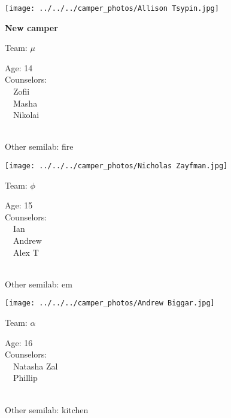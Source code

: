 \documentclass[10pt,letterpaper, landscape]{article}
\begin{document}
\horizontalshiftfornextsticker
\renewcommand{\baselinestretch}{1} \begin{sticker}
\noindent\begin{minipage}{0.5\textwidth}\texttt{[image: ../../../camper\_photos/Allison Tsypin.jpg]}\end{minipage}\begin{minipage}{0.45\textwidth}
\textbf{New camper} 

Team: {\Large $\mu$}

Age:        14\\
Counselors: \\\ \ Zofii\\\ \ Masha\\\ \ Nikolai\\
\end{minipage} \\ \vspace{0.07in}
Other semilab: fire
\end{sticker}
\horizontalshiftfornextsticker
\renewcommand{\baselinestretch}{1} \begin{sticker}
\noindent\begin{minipage}{0.5\textwidth}\texttt{[image: ../../../camper\_photos/Nicholas Zayfman.jpg]}\end{minipage}\begin{minipage}{0.45\textwidth}
Team: {\Large $\phi$}

Age:        15\\
Counselors: \\\ \ Ian\\\ \ Andrew\\\ \ Alex T\\
\end{minipage} \\ \vspace{0.07in}
Other semilab: em
\end{sticker}
\horizontalshiftfornextsticker
\renewcommand{\baselinestretch}{1} \begin{sticker}
\noindent\begin{minipage}{0.5\textwidth}\texttt{[image: ../../../camper\_photos/Andrew Biggar.jpg]}\end{minipage}\begin{minipage}{0.45\textwidth}
Team: {\Large $\alpha$}

Age:        16\\
Counselors: \\\ \ Natasha Zal\\\ \ Phillip\\
\end{minipage} \\ \vspace{0.07in}
Other semilab: kitchen
\end{sticker}
\end{document}

